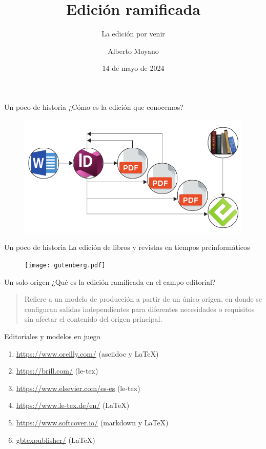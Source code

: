 \documentclass[14pt,aspectratio=169]{beamer}
\title{Edición ramificada}
\subtitle{La edición por venir}
\author{Alberto Moyano}
\date{14 de mayo de 2024}
\institute{\url{https://github.com/albertomoyano/CHARLAMATE}}
\begin{document}
	\begin{frame}
		\titlepage
	\end{frame}

\begin{frame}{Un poco de historia}
	¿Cómo es la edición que conocemos?

	\begin{figure}
	\centering
	\includegraphics[width=.7\textwidth]{ciclos.pdf}
\end{figure}
\end{frame}

\begin{frame}{Un poco de historia}
	La edición de libros y revistas en tiempos preinformáticos
	\begin{figure}
		\centering
		\texttt{[image: gutenberg.pdf]}
	\end{figure}
\end{frame}

\begin{frame}{Un solo origen}
	¿Qué es la edición ramificada en el campo editorial?\vspace{14pt}

	\begin{quote}
	Refiere a un modelo de producción a partir de un único origen, en donde se configuran salidas independientes para diferentes necesidades o requisitos sin afectar el contenido del origen principal.
	\end{quote}
\end{frame}

\begin{frame}{Editoriales y modelos en juego}
	\begin{enumerate}
		\item \url{https://www.oreilly.com/} (asciidoc y LaTeX)
		\item \url{https://brill.com/} (le-tex)
		\item \url{https://www.elsevier.com/es-es} (le-tex)
		\item \url{https://www.le-tex.de/en/} (LaTeX)
		\item \url{https://www.softcover.io/} (markdown y LaTeX)
		\item \url{gbtexpublisher/} (LaTeX)
	\end{enumerate}
\end{frame}
\end{document}
